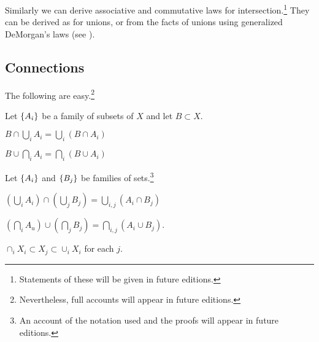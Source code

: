 Similarly we can derive associative and commutative laws for intersection.\footnote{Statements of these will be given in future editions.}
They can be derived as for unions, or from the facts of unions using generalized DeMorgan's laws (see ).

\subsection*{Connections}

The following are easy.\footnote{Nevertheless, full accounts will appear in future editions.}

Let $\{A_i\}$ be a family of subsets of $X$ and let $B \subset X$.

\begin{proposition}
$B \cap \bigcup_{i} A_i = \bigcup_{i} (B \cap A_i)$
\end{proposition}

\begin{proposition}
$B \cup \bigcap_{i} A_i = \bigcap_{i} (B \cup A_i)$
\end{proposition}

Let $\{A_i\}$ and $\{B_j\}$ be families of sets.\footnote{An account of the notation used and the proofs will appear in future editions.}

\begin{proposition}
$(\bigcup_{i} A_i) \cap (\bigcup_{j} B_j) = \bigcup_{i,j}(A_i \cap B_j)$
\end{proposition}

\begin{proposition}
$(\bigcap_{i} A_u) \cup (\bigcap_{j} B_j) = \bigcap_{i,j}(A_i \cup B_j).$
\end{proposition}

\begin{proposition}
$\cap _i X_i \subset X_j \subset \cup_i X_i$ for each $j$.
\end{proposition}

